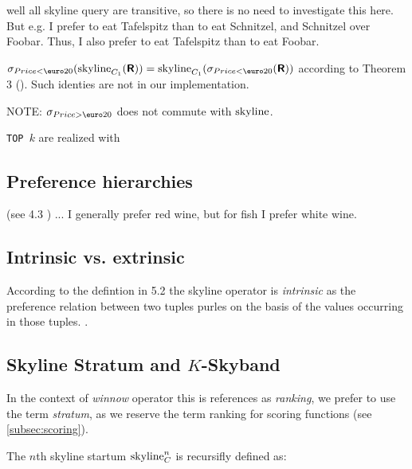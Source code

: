 
well all skyline query are transitive, so there is no need to investigate this here. But e.g. I prefer to eat Tafelspitz than to eat Schnitzel, and Schnitzel over Foobar. Thus, I also prefer to eat Tafelspitz than to eat Foobar.


$\sigma_{Price<\textnormal{\euro}20}(\skyline_{C_1}(\relation{R}))=\skyline_{C_1}(\sigma_{Price<\textnormal{\euro}20}(\relation{R}))$
according to Theorem 3 (\citep{Chomicki2002}).
Such identies are not in our implementation.

NOTE: $\sigma_{Price>\textnormal{\euro}20}$ does not commute with $\skyline$.


\texttt{TOP $k$} are realized with 

\subsection{Preference hierarchies}
(see 4.3 \citep{Chomicki2002}) ... I generally prefer red wine, but for fish I prefer white wine.


\subsection{Intrinsic vs. extrinsic}
According to the defintion in 5.2 \citep{Chomicki2002} the skyline operator is \emph{intrinsic} as the preference relation between two tuples purles on the basis of the values occurring in those tuples. .

\subsection{Skyline Stratum and $K$-Skyband}

In the context of \emph{winnow} operator this is references as \emph{ranking}, we prefer to use the term \emph{stratum}, as we reserve the term ranking for scoring functions (see \ref{subsec:scoring}).

The $n$th skyline startum $\skyline_C^n$ is recursifly defined as:

